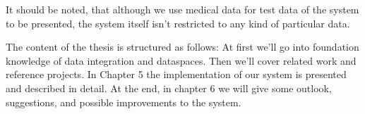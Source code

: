 It should be noted, that although we use medical data for test data of the system to be presented, the system itself isn't restricted to any kind of particular data.

The content of the thesis is structured as follows: At first we'll go into foundation knowledge of data integration and dataspaces. Then we'll cover related work and reference projects. In Chapter 5 the implementation of our system is presented and described in detail. At the end, in chapter 6 we will give some outlook, suggestions, and possible improvements to the system. 
